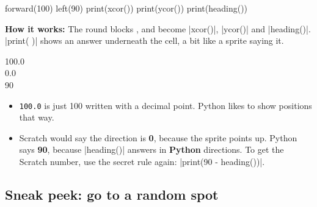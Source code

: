 \begin{tcbraster}[raster columns=2, raster equal height=rows, raster column skip=12pt, raster valign=center]
\begin{tcolorbox}[colback=white, colframe=white, boxrule=0pt, valign=center]
\begin{scratch}
\end{scratch}
\end{tcolorbox}
\begin{code}
forward(100)
left(90)
print(xcor())
print(ycor())
print(heading())
\end{code}
\end{tcbraster}

\textbf{How it works:} The round blocks ,  and  become \py|xcor()|, \py|ycor()| and \py|heading()|. \py|print( )| shows an answer underneath the cell, a bit like a sprite saying it.

\begin{outputbox}
100.0\\
0.0\\
90
\end{outputbox}

\begin{think}
\begin{itemize}
  \item \texttt{100.0} is just 100 written with a decimal point. Python likes to show positions that way.
  \item Scratch would say the direction is \textbf{0}, because the sprite points up. Python says \textbf{90}, because \py|heading()| answers in \textbf{Python} directions. To get the Scratch number, use the secret rule again: \py|print(90 - heading())|.
\end{itemize}
\end{think}

\subsection*{Sneak peek: go to a random spot}

